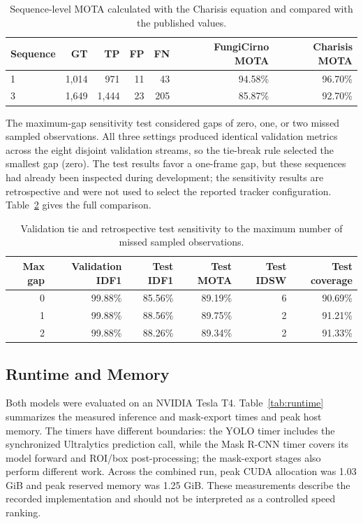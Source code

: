 \documentclass[11pt,a4paper]{article}
\begin{document}
\begin{table}[!htbp]
\centering\small
\caption{Sequence-level MOTA calculated with the Charisis equation and compared with the published values.}
\label{tab:mota-charisis}
\begin{tabular}{lrrrrrr}
\toprule
Sequence & GT & TP & FP & FN & FungiCirno MOTA & Charisis MOTA \\
\midrule
1 & 1,014 & 971 & 11 & 43 & 94.58\% & 96.70\% \\
3 & 1,649 & 1,444 & 23 & 205 & 85.87\% & 92.70\% \\
\bottomrule
\end{tabular}
\end{table}

The maximum-gap sensitivity test considered gaps of zero, one, or two missed sampled observations. All three settings produced identical validation metrics across the eight disjoint validation streams, so the tie-break rule selected the smallest gap (zero). The test results favor a one-frame gap, but these sequences had already been inspected during development; the sensitivity results are retrospective and were not used to select the reported tracker configuration. Table~\ref{tab:gap-sensitivity} gives the full comparison.

\begin{table}[!htbp]
\centering\small
\caption{Validation tie and retrospective test sensitivity to the maximum number of missed sampled observations.}
\label{tab:gap-sensitivity}
\begin{tabular}{rrrrrr}
\toprule
Max gap & Validation IDF1 & Test IDF1 & Test MOTA & Test IDSW & Test coverage \\
\midrule
0 & 99.88\% & 85.56\% & 89.19\% & 6 & 90.69\% \\
1 & 99.88\% & 88.56\% & 89.75\% & 2 & 91.21\% \\
2 & 99.88\% & 88.26\% & 89.34\% & 2 & 91.33\% \\
\bottomrule
\end{tabular}
\end{table}

\subsection{Runtime and Memory}

Both models were evaluated on an NVIDIA Tesla T4. Table~\ref{tab:runtime} summarizes the measured inference and mask-export times and peak host memory. The timers have different boundaries: the YOLO timer includes the synchronized Ultralytics prediction call, while the Mask R-CNN timer covers its model forward and ROI/box post-processing; the mask-export stages also perform different work. Across the combined run, peak CUDA allocation was 1.03 GiB and peak reserved memory was 1.25 GiB. These measurements describe the recorded implementation and should not be interpreted as a controlled speed ranking.
\end{document}
